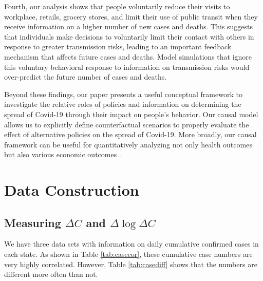 \documentclass[11pt,reqno,letter]{amsart}
\theoremstyle{definition}
\begin{document}
Fourth, our analysis shows that people voluntarily reduce their visits to workplace, retails, grocery stores, and limit their use of public transit when they receive  information on a higher number of new cases and deaths. This suggests that individuals make decisions to voluntarily limit their contact with others in response to greater transmission risks, leading to an important feedback mechanism that affects future cases and deaths. Model simulations that ignore this voluntary behavioral response to information on transmission risks would over-predict the future number of cases and deaths.

Beyond these findings, our paper presents a useful conceptual framework to investigate the relative roles of policies and information on determining the spread of Covid-19 through their impact on people's behavior. Our causal model allows us  to explicitly define counterfactual scenarios to properly evaluate the effect of alternative policies on the spread of Covid-19. %
 More broadly, our  causal framework can be useful for quantitatively analyzing not only health outcomes but also various economic outcomes \citep{bartik2020, chetty2020real}.





\FloatBarrier

\begin{footnotesize}




\end{footnotesize}


\newpage

\appendix

\section{Data Construction}


\subsection{Measuring $\Delta C$ and $\Delta\log \Delta C$}

We have three data sets with information on daily cumulative confirmed
cases in each state. As shown in Table \ref{tab:casecor}, these
cumulative case numbers are very highly correlated. However, Table
\ref{tab:casediff} shows that the numbers are different more often
than not.
\end{document}
